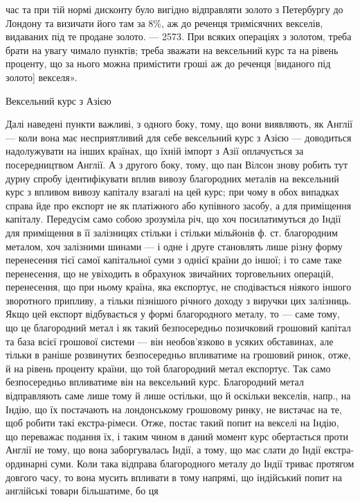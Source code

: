 час та при тій нормі дисконту було вигідно відправляти золото з Петербургу до
Лондону та визичати його там за 8\%, аж до реченця тримісячних векселів, видаваних
під те продане золото. — 2573. При всяких операціях з золотом, треба
брати на увагу чимало пунктів; треба зважати на вексельний курс та на рівень
проценту, що за нього можна примістити гроші аж до реченця [виданого під
золото] векселя».

Вексельний курс з Азією

Далі наведені пункти важливі, з одного боку, тому, що вони виявляють,
як Англії — коли вона має несприятливий для себе вексельний курс з Азією —
доводиться надолужувати на інших країнах, що їхній імпорт з Азії оплачується
за посередництвом Англії. А з другого боку, тому, що пан Вілсон знову робить
тут дурну спробу ідентифікувати вплив вивозу благородних металів на вексельний
курс з впливом вивозу капіталу взагалі на цей курс; при чому в обох
випадках справа йде про експорт не як платіжного або купівного засобу, а для
приміщення капіталу. Передусім само собою зрозуміла річ, що хоч посилатимуться
до Індії для приміщення в її залізницях стільки і стільки мільйонів ф. ст. благородним
металом, хоч залізними шинами — і одне і друге становлять лише
різну форму перенесення тієї самої капітальної суми з однієї країни до іншої;
і то саме таке перенесення, що не увіходить в обрахунок звичайних торговельних
операцій, перенесення, що при ньому країна, яка експортує, не сподівається
ніякого іншого зворотного припливу, а тільки пізнішого річного доходу з виручки
цих залізниць. Якщо цей експорт відбувається у формі благородного металу,
то — саме тому, що це благородний метал і як такий безпосередньо позичковий
грошовий капітал та база всієї грошової системи — він необов’язково в
усяких обставинах, але тільки в раніше розвинутих безпосередньо впливатиме
на грошовий ринок, отже, й на рівень проценту країни, що той благородний
метал експортує. Так само безпосередньо впливатиме він на вексельний курс.
Благородний метал відправляють саме лише тому й лише остільки, що й оскільки
векселів, напр., на Індію, що їх постачають на лондонському грошовому ринку,
не вистачає на те, щоб робити такі екстра-рімеси. Отже, постає такий попит
на векселі на Індію, що переважає подання їх, і таким чином в даний
момент курс обертається проти Англії не тому, що вона заборгувалась Індії, а
тому, що має слати до Індії екстра-ординарні суми. Коли така відправа благородного
металу до Індії триває протягом довгого часу, то вона мусить впливати
в тому напрямі, що індійський попит на англійські товари більшатиме, бо ця
